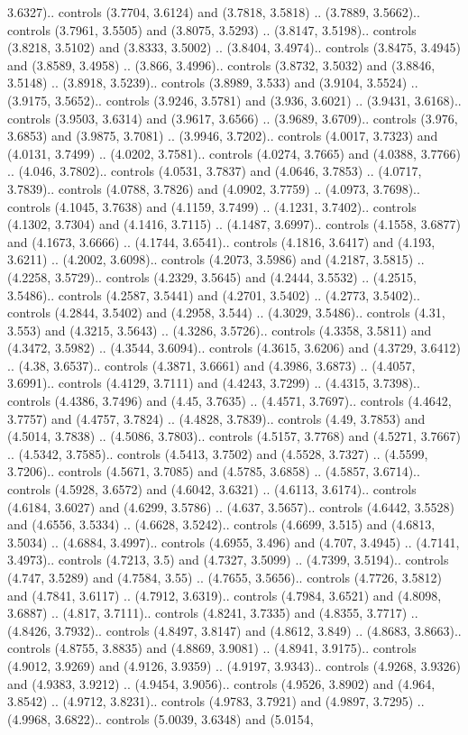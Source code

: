 3.6327).. controls (3.7704, 3.6124) and (3.7818, 3.5818) .. (3.7889, 3.5662).. controls (3.7961, 3.5505) and (3.8075, 3.5293) .. (3.8147, 3.5198).. controls (3.8218, 3.5102) and (3.8333, 3.5002) .. (3.8404, 3.4974).. controls (3.8475, 3.4945) and (3.8589, 3.4958) .. (3.866, 3.4996).. controls (3.8732, 3.5032) and (3.8846, 3.5148) .. (3.8918, 3.5239).. controls (3.8989, 3.533) and (3.9104, 3.5524) .. (3.9175, 3.5652).. controls (3.9246, 3.5781) and (3.936, 3.6021) .. (3.9431, 3.6168).. controls (3.9503, 3.6314) and (3.9617, 3.6566) .. (3.9689, 3.6709).. controls (3.976, 3.6853) and (3.9875, 3.7081) .. (3.9946, 3.7202).. controls (4.0017, 3.7323) and (4.0131, 3.7499) .. (4.0202, 3.7581).. controls (4.0274, 3.7665) and (4.0388, 3.7766) .. (4.046, 3.7802).. controls (4.0531, 3.7837) and (4.0646, 3.7853) .. (4.0717, 3.7839).. controls (4.0788, 3.7826) and (4.0902, 3.7759) .. (4.0973, 3.7698).. controls (4.1045, 3.7638) and (4.1159, 3.7499) .. (4.1231, 3.7402).. controls (4.1302, 3.7304) and (4.1416, 3.7115) .. (4.1487, 3.6997).. controls (4.1558, 3.6877) and (4.1673, 3.6666) .. (4.1744, 3.6541).. controls (4.1816, 3.6417) and (4.193, 3.6211) .. (4.2002, 3.6098).. controls (4.2073, 3.5986) and (4.2187, 3.5815) .. (4.2258, 3.5729).. controls (4.2329, 3.5645) and (4.2444, 3.5532) .. (4.2515, 3.5486).. controls (4.2587, 3.5441) and (4.2701, 3.5402) .. (4.2773, 3.5402).. controls (4.2844, 3.5402) and (4.2958, 3.544) .. (4.3029, 3.5486).. controls (4.31, 3.553) and (4.3215, 3.5643) .. (4.3286, 3.5726).. controls (4.3358, 3.5811) and (4.3472, 3.5982) .. (4.3544, 3.6094).. controls (4.3615, 3.6206) and (4.3729, 3.6412) .. (4.38, 3.6537).. controls (4.3871, 3.6661) and (4.3986, 3.6873) .. (4.4057, 3.6991).. controls (4.4129, 3.7111) and (4.4243, 3.7299) .. (4.4315, 3.7398).. controls (4.4386, 3.7496) and (4.45, 3.7635) .. (4.4571, 3.7697).. controls (4.4642, 3.7757) and (4.4757, 3.7824) .. (4.4828, 3.7839).. controls (4.49, 3.7853) and (4.5014, 3.7838) .. (4.5086, 3.7803).. controls (4.5157, 3.7768) and (4.5271, 3.7667) .. (4.5342, 3.7585).. controls (4.5413, 3.7502) and (4.5528, 3.7327) .. (4.5599, 3.7206).. controls (4.5671, 3.7085) and (4.5785, 3.6858) .. (4.5857, 3.6714).. controls (4.5928, 3.6572) and (4.6042, 3.6321) .. (4.6113, 3.6174).. controls (4.6184, 3.6027) and (4.6299, 3.5786) .. (4.637, 3.5657).. controls (4.6442, 3.5528) and (4.6556, 3.5334) .. (4.6628, 3.5242).. controls (4.6699, 3.515) and (4.6813, 3.5034) .. (4.6884, 3.4997).. controls (4.6955, 3.496) and (4.707, 3.4945) .. (4.7141, 3.4973).. controls (4.7213, 3.5) and (4.7327, 3.5099) .. (4.7399, 3.5194).. controls (4.747, 3.5289) and (4.7584, 3.55) .. (4.7655, 3.5656).. controls (4.7726, 3.5812) and (4.7841, 3.6117) .. (4.7912, 3.6319).. controls (4.7984, 3.6521) and (4.8098, 3.6887) .. (4.817, 3.7111).. controls (4.8241, 3.7335) and (4.8355, 3.7717) .. (4.8426, 3.7932).. controls (4.8497, 3.8147) and (4.8612, 3.849) .. (4.8683, 3.8663).. controls (4.8755, 3.8835) and (4.8869, 3.9081) .. (4.8941, 3.9175).. controls (4.9012, 3.9269) and (4.9126, 3.9359) .. (4.9197, 3.9343).. controls (4.9268, 3.9326) and (4.9383, 3.9212) .. (4.9454, 3.9056).. controls (4.9526, 3.8902) and (4.964, 3.8542) .. (4.9712, 3.8231).. controls (4.9783, 3.7921) and (4.9897, 3.7295) .. (4.9968, 3.6822).. controls (5.0039, 3.6348) and (5.0154, 